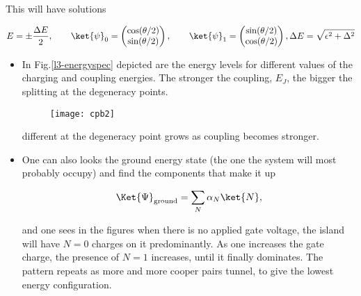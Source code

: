 \begin{framed}\noindent
  This will have solutions

   \begin{equation}
     E = \pm \frac{\Delta E}{2}, \qquad \ket{\psi}_0 = \begin{pmatrix}
       \cos(\theta/2) \\ \sin(\theta/2)
     \end{pmatrix},  \qquad  \ket{\psi}_1  = \begin{pmatrix}  \sin(\theta/2)  \\
       \cos(\theta/2)
     \end{pmatrix}, \Delta E = \sqrt{\epsilon^2+\Delta^2}
   \end{equation}
 \end{framed}

 \begin{itemize}
 \item In Fig.\ref{l3-energyspec} depicted  are the energy levels for
   different  values  of the  charging  and  coupling energies.   The
   stronger the  coupling, $ E_J $,  the bigger the splitting  at the
   degeneracy points.

   \begin{figure}[h]
     \centering \texttt{[image: cpb2]}
   \end{figure}

\noindent
different  at   the  degeneracy  point  grows   as  coupling  becomes
stronger.\label{l3-energyspec}

\item One can also looks the  ground energy state (the one the system
  will most probably occupy) and find the components that make it up

  \[
    \Ket{\Psi}_{\text{ground}} = \sum_N\alpha_N\ket{N},
  \]

  \noindent and one sees in the figures when there is no applied gate
  voltage,   the  island   will  have   $   N=0  $   charges  on   it
  predominantly. As  one increases the  gate charge, the  presence of
  $ N=1 $ increases, until it finally dominates.  The pattern repeats
  as more  and more cooper  pairs tunnel,  to give the  lowest energy
  configuration.
\end{itemize}

